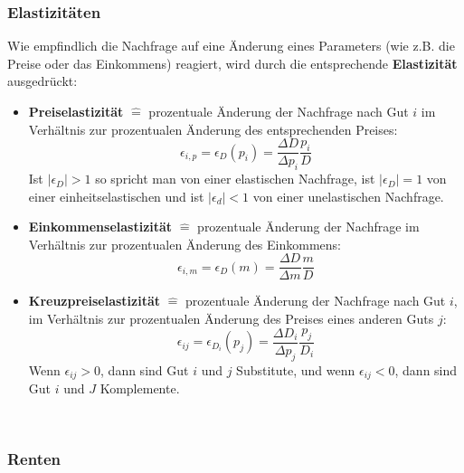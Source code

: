 \subsubsection*{Elastizitäten}

Wie empfindlich die Nachfrage auf eine Änderung eines Parameters (wie z.B. die Preise oder das Einkommens) reagiert, wird durch die entsprechende \textbf{Elastizität} ausgedrückt:
\begin{itemize}
	\item \textbf{Preiselastizität} $\hat{=}$ prozentuale Änderung der Nachfrage nach Gut $i$ im Verhältnis zur prozentualen Änderung des entsprechenden Preises: 
	$$ \epsilon_{i, p} = \epsilon_D(p_i) = \frac{\Delta D}{\Delta p_i} \frac{p_i}{D} $$
	Ist $|\epsilon_D| > 1$ so spricht man von einer elastischen Nachfrage, ist $|\epsilon_D| = 1$ von einer einheitselastischen und ist $|\epsilon_d| < 1$ von einer unelastischen Nachfrage.
	\item \textbf{Einkommenselastizität} $\hat{=}$ prozentuale Änderung der Nachfrage im Verhältnis zur prozentualen Änderung des Einkommens: $$ \epsilon_{i, m} = \epsilon_D(m) = \frac{\Delta D}{\Delta m} \frac{m}{D} $$
	\item \textbf{Kreuzpreiselastizität} $\hat{=}$ prozentuale Änderung der Nachfrage  nach Gut $i$, im Verhältnis zur prozentualen Änderung des Preises eines anderen Guts $j$: 
	$$ \epsilon_{ij} = \epsilon_{D_i}(p_j) = \frac{\Delta D_i}{\Delta p_j} \frac{p_j}{D_i} $$
	Wenn $\epsilon_{ij} > 0$, dann sind Gut $i$ und $j$ Substitute, und wenn $\epsilon_{ij} < 0$, dann sind Gut $i$ und $J$ Komplemente.
\end{itemize} ~\smallskip

\subsubsection*{Renten}

